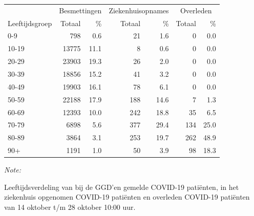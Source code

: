 \documentclass[
  english,
  man,floatsintext]{apa6}
\begin{document}
\begin{table}[H]
\centering\begingroup\fontsize{11}{13}\selectfont

\begin{threeparttable}
\begin{tabular}{lrrrrrr}
\toprule
\multicolumn{1}{c}{ } & \multicolumn{2}{c}{Besmettingen} & \multicolumn{2}{c}{Ziekenhuisopnames} & \multicolumn{2}{c}{Overleden} \\
\cmidrule(l{3pt}r{3pt}){2-3} \cmidrule(l{3pt}r{3pt}){4-5} \cmidrule(l{3pt}r{3pt}){6-7}
Leeftijdsgroep & Totaal & \% & Totaal & \% & Totaal & \%\\
\midrule
0-9 & 798 & 0.6 & 21 & 1.6 & 0 & 0.0\\
10-19 & 13775 & 11.1 & 8 & 0.6 & 0 & 0.0\\
20-29 & 23903 & 19.3 & 26 & 2.0 & 0 & 0.0\\
30-39 & 18856 & 15.2 & 41 & 3.2 & 0 & 0.0\\
40-49 & 19903 & 16.1 & 78 & 6.1 & 0 & 0.0\\
50-59 & 22188 & 17.9 & 188 & 14.6 & 7 & 1.3\\
60-69 & 12393 & 10.0 & 242 & 18.8 & 35 & 6.5\\
70-79 & 6898 & 5.6 & 377 & 29.4 & 134 & 25.0\\
80-89 & 3864 & 3.1 & 253 & 19.7 & 262 & 48.9\\
90+ & 1191 & 1.0 & 50 & 3.9 & 98 & 18.3\\
\bottomrule
\end{tabular}
\begin{tablenotes}
\item \textit{Note: } 
\item Leeftijdsverdeling van bij de GGD’en gemelde COVID-19 patiënten, in het ziekenhuis opgenomen COVID-19 patiënten en overleden COVID-19 patiënten van 14 oktober t/m 28 oktober 10:00 uur.
\end{tablenotes}
\end{threeparttable}
\endgroup{}
\end{table}
\end{document}
